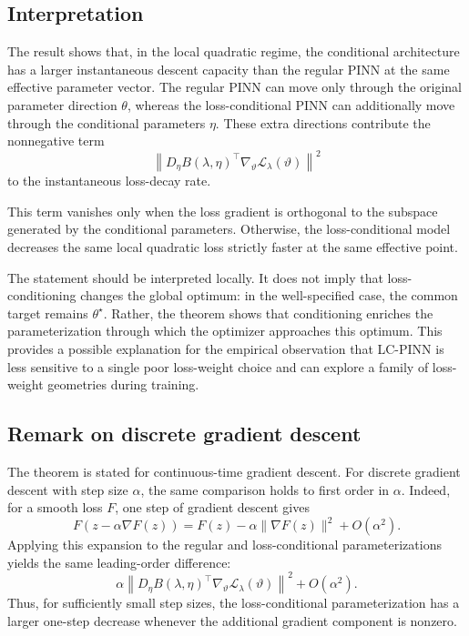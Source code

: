 \documentclass{article}
\theoremstyle{plain}
\theoremstyle{definition}
\theoremstyle{remark}
\begin{document}
\subsection{Interpretation}

The result shows that, in the local quadratic regime, the conditional
architecture has a larger instantaneous descent capacity than the
regular PINN at the same effective parameter vector. The regular PINN
can move only through the original parameter direction $\theta$, whereas
the loss-conditional PINN can additionally move through the conditional
parameters $\eta$. These extra directions contribute the nonnegative
term
\[
    \left\|
        D_\eta B(\lambda,\eta)^\top
        \nabla_\vartheta
        \mathcal{L}_{\lambda}(\vartheta)
    \right\|^2
\]
to the instantaneous loss-decay rate.

This term vanishes only when the loss gradient is orthogonal to the
subspace generated by the conditional parameters. Otherwise, the
loss-conditional model decreases the same local quadratic loss strictly
faster at the same effective point.

The statement should be interpreted locally. It does not imply that
loss-conditioning changes the global optimum: in the well-specified
case, the common target remains $\theta^\star$. Rather, the theorem
shows that conditioning enriches the parameterization through which the
optimizer approaches this optimum. This provides a possible explanation
for the empirical observation that LC-PINN is less sensitive to a single
poor loss-weight choice and can explore a family of loss-weight
geometries during training.

\subsection{Remark on discrete gradient descent}

The theorem is stated for continuous-time gradient descent. For discrete
gradient descent with step size $\alpha$, the same comparison holds to
first order in $\alpha$. Indeed, for a smooth loss $F$, one step of
gradient descent gives
\[
    F(z-\alpha \nabla F(z))
    =
    F(z)
    -
    \alpha \|\nabla F(z)\|^2
    +
    O(\alpha^2).
\]
Applying this expansion to the regular and loss-conditional
parameterizations yields the same leading-order difference:
\[
    \alpha
    \left\|
        D_\eta B(\lambda,\eta)^\top
        \nabla_\vartheta
        \mathcal{L}_{\lambda}(\vartheta)
    \right\|^2
    +
    O(\alpha^2).
\]
Thus, for sufficiently small step sizes, the loss-conditional
parameterization has a larger one-step decrease whenever the additional
gradient component is nonzero.
\end{document}
